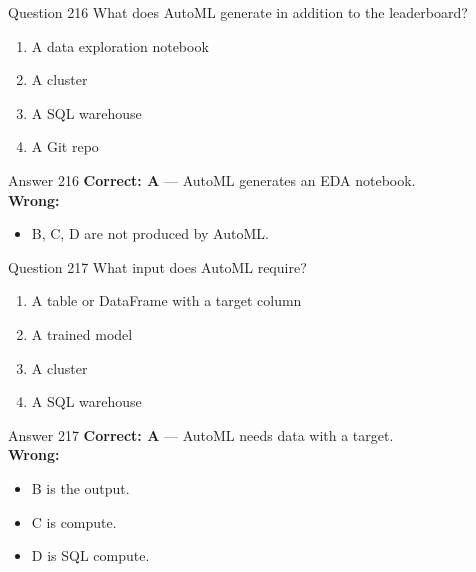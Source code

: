 \documentclass[aspectratio=169,11pt]{beamer}
\begin{document}
	\begin{frame}{Question 216}
		What does AutoML generate in addition to the leaderboard?
		\begin{enumerate}[label=\Alph*.]
			\item A data exploration notebook
			\item A cluster
			\item A SQL warehouse
			\item A Git repo
		\end{enumerate}
	\end{frame}
	\begin{frame}{Answer 216}
		\textbf{Correct: A} --- AutoML generates an EDA notebook.\\
		\vspace{0.5em}
		\textbf{Wrong:}
		\begin{itemize}
			\item B, C, D are not produced by AutoML.
		\end{itemize}
	\end{frame}
	
	\begin{frame}{Question 217}
		What input does AutoML require?
		\begin{enumerate}[label=\Alph*.]
			\item A table or DataFrame with a target column
			\item A trained model
			\item A cluster
			\item A SQL warehouse
		\end{enumerate}
	\end{frame}
	\begin{frame}{Answer 217}
		\textbf{Correct: A} --- AutoML needs data with a target.\\
		\vspace{0.5em}
		\textbf{Wrong:}
		\begin{itemize}
			\item B is the output.
			\item C is compute.
			\item D is SQL compute.
		\end{itemize}
	\end{frame}
	
\end{document}
